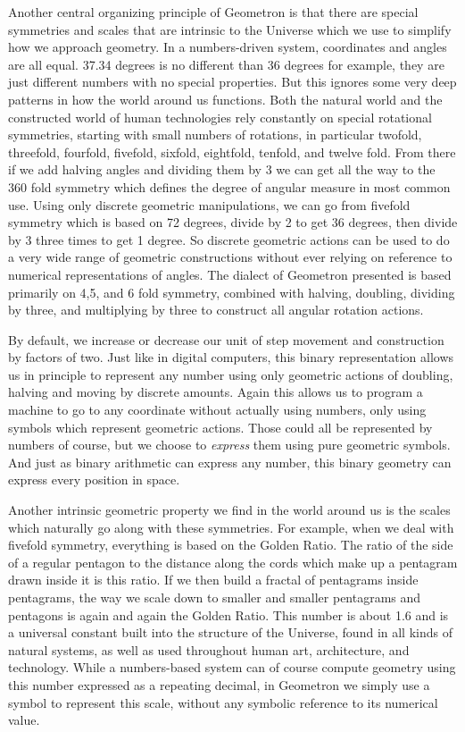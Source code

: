 Another central organizing principle of Geometron is that there are special symmetries and scales that are intrinsic to the Universe which we use to simplify how we approach geometry.  In a numbers-driven system, coordinates and angles are all equal.  37.34 degrees is no different than 36 degrees for example, they are just different numbers with no special properties.  But this ignores some very deep patterns in how the world around us functions.  Both the natural world and the constructed world of human technologies rely constantly on special rotational symmetries, starting with small numbers of rotations, in particular twofold, threefold, fourfold, fivefold, sixfold, eightfold, tenfold, and twelve fold.  From there if we add halving angles and dividing them by 3 we can get all the way to the 360 fold symmetry which defines the degree of angular measure in most common use.  Using only discrete geometric manipulations, we can go from fivefold symmetry which is based on 72 degrees, divide by 2 to get 36 degrees, then divide by 3 three times to get 1 degree.  So discrete geometric actions can be used to do a very wide range of geometric constructions without ever relying on reference to numerical representations of angles.  The dialect of Geometron presented is based primarily on 4,5, and 6 fold symmetry, combined with halving, doubling, dividing by three, and multiplying by three to construct all angular rotation actions. 

By default, we increase or decrease our unit of step movement and construction by factors of two.  Just like in digital computers, this binary representation allows us in principle to represent any number using only geometric actions of doubling, halving and moving by discrete amounts.  Again this allows us to program a machine to go to any coordinate without actually using numbers, only using symbols which represent geometric actions.  Those could all be represented by numbers of course, but we choose to \emph{express} them using pure geometric symbols.  And just as binary arithmetic can express any number, this binary geometry can express every position in space.

Another intrinsic geometric property we find in the world around us is the scales which naturally go along with these symmetries.  For example, when we deal with fivefold symmetry, everything is based on the Golden Ratio.  The ratio of the side of a regular pentagon to the distance along the cords which make up a pentagram drawn inside it is this ratio.  If we then build a fractal of pentagrams inside pentagrams, the way we scale down to smaller and smaller pentagrams and pentagons is again and again the Golden Ratio.  This number is about 1.6 and is a universal constant built into the structure of the Universe, found in all kinds of natural systems, as well as used throughout human art, architecture, and technology.  While a numbers-based system can of course compute geometry using this number expressed as a repeating decimal, in Geometron we simply use a symbol to represent this scale, without any symbolic reference to its numerical value.  


